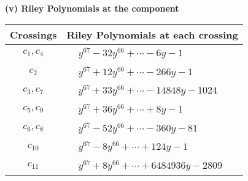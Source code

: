 \documentclass[1p]{elsarticle_modified}
\theoremstyle{definition}
\begin{document}
\newpage\renewcommand{\arraystretch}{1}
\flushleft \textbf{(v) Riley Polynomials at the component}\newline \\
\begin{tabular}{m{50pt}|m{274pt}}
Crossings & \hspace{64pt}Riley Polynomials at each crossing \\
\hline $$\begin{aligned}c_{1},c_{4}\end{aligned}$$&$\begin{aligned}
&y^{67}-32 y^{66}+\cdots-6 y-1
\end{aligned}$\\
\hline $$\begin{aligned}c_{2}\end{aligned}$$&$\begin{aligned}
&y^{67}+12 y^{66}+\cdots-266 y-1
\end{aligned}$\\
\hline $$\begin{aligned}c_{3},c_{7}\end{aligned}$$&$\begin{aligned}
&y^{67}+33 y^{66}+\cdots-14848 y-1024
\end{aligned}$\\
\hline $$\begin{aligned}c_{5},c_{9}\end{aligned}$$&$\begin{aligned}
&y^{67}+36 y^{66}+\cdots+8 y-1
\end{aligned}$\\
\hline $$\begin{aligned}c_{6},c_{8}\end{aligned}$$&$\begin{aligned}
&y^{67}-52 y^{66}+\cdots-360 y-81
\end{aligned}$\\
\hline $$\begin{aligned}c_{10}\end{aligned}$$&$\begin{aligned}
&y^{67}-8 y^{66}+\cdots+124 y-1
\end{aligned}$\\
\hline $$\begin{aligned}c_{11}\end{aligned}$$&$\begin{aligned}
&y^{67}+8 y^{66}+\cdots+6484936 y-2809
\end{aligned}$\\
\hline
\end{tabular}\\~\\
\end{document}
